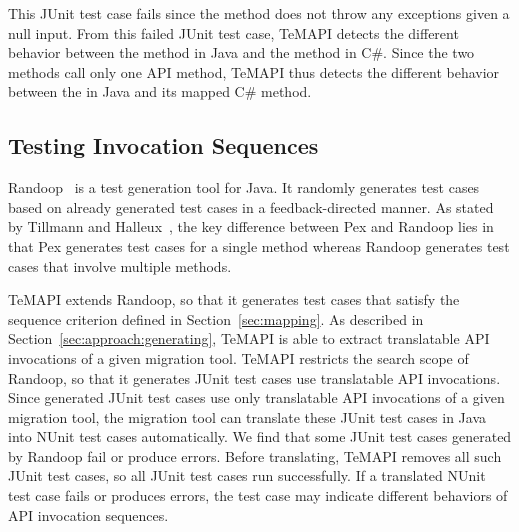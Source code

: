 This JUnit test case fails since the  method does not throw any exceptions given a null input.
From this failed JUnit test case, TeMAPI detects the different behavior between the  method in Java and the  method in C\#. Since the two methods call only one API method, TeMAPI thus detects the different behavior between the  in Java and its mapped C\# method.

\subsection{Testing Invocation Sequences}
\label{sec:approach:sequence}
Randoop~\cite{pacheco2007feedback} is a test generation tool for Java. It randomly generates test cases based on already generated test cases in a feedback-directed manner. As stated by Tillmann and Halleux~\cite{tillmann2008pex}, the key difference between Pex and Randoop lies in that Pex generates test cases for a single method whereas Randoop generates test cases that involve multiple methods.

TeMAPI extends Randoop, so that it generates test cases that satisfy the sequence criterion defined in Section~\ref{sec:mapping}. As described in Section~\ref{sec:approach:generating}, TeMAPI is able to extract translatable API invocations of a given migration tool. TeMAPI restricts the search scope of Randoop, so that it generates JUnit test cases use translatable API invocations. Since generated JUnit test cases use only translatable API invocations of a given migration tool, the migration tool can translate these JUnit test cases in Java into NUnit test cases automatically. We find that some JUnit test cases generated by Randoop fail or produce errors. Before translating, TeMAPI removes all such JUnit test cases, so all JUnit test cases run successfully. If a translated NUnit test case fails or produces errors, the test case may indicate different behaviors of API invocation sequences.



